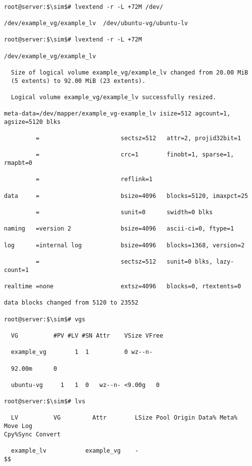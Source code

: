 \documentclass[14pt, a4paper]{article}
\begin{document}
\begin{lstlisting}

root@server:$\sim$# lvextend -r -L +72M /dev/

/dev/example_vg/example_lv  /dev/ubuntu-vg/ubuntu-lv

root@server:$\sim$# lvextend -r -L +72M

/dev/example_vg/example_lv

  Size of logical volume example_vg/example_lv changed from 20.00 MiB 
  (5 extents) to 92.00 MiB (23 extents).

  Logical volume example_vg/example_lv successfully resized.

meta-data=/dev/mapper/example_vg-example_lv isize=512 agcount=1, agsize=5120 blks

         =                       sectsz=512   attr=2, projid32bit=1

         =                       crc=1        finobt=1, sparse=1, rmapbt=0

         =                       reflink=1

data     =                       bsize=4096   blocks=5120, imaxpct=25

         =                       sunit=0      swidth=0 blks

naming   =version 2              bsize=4096   ascii-ci=0, ftype=1

log      =internal log           bsize=4096   blocks=1368, version=2

         =                       sectsz=512   sunit=0 blks, lazy-count=1

realtime =none                   extsz=4096   blocks=0, rtextents=0

data blocks changed from 5120 to 23552

root@server:$\sim$# vgs

  VG          #PV #LV #SN Attr    VSize VFree

  example_vg        1  1          0 wz--n-

  92.00m      0

  ubuntu-vg     1   1  0   wz--n- <9.00g   0

root@server:$\sim$# lvs

  LV          VG         Attr        LSize Pool Origin Data% Meta% Move Log
Cpy%Sync Convert

  example_lv           example_vg    -
$$
\end{lstlisting}
\vspace{0.2cm}
\end{document}
